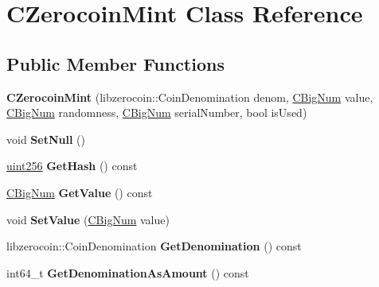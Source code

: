 \hypertarget{class_c_zerocoin_mint}{}\section{C\+Zerocoin\+Mint Class Reference}
\label{class_c_zerocoin_mint}
\subsection*{Public Member Functions}
\begin{DoxyCompactItemize}
\item 
\mbox{\label{class_c_zerocoin_mint_a6f178cd668b15c974a70d92f3e7d4118}} 
{\bfseries C\+Zerocoin\+Mint} (libzerocoin\+::\+Coin\+Denomination denom, \mbox{\hyperlink{class_c_big_num}{C\+Big\+Num}} value, \mbox{\hyperlink{class_c_big_num}{C\+Big\+Num}} randomness, \mbox{\hyperlink{class_c_big_num}{C\+Big\+Num}} serial\+Number, bool is\+Used)
\item 
\mbox{\label{class_c_zerocoin_mint_afd517487620060b8c218a6376c2983d7}} 
void {\bfseries Set\+Null} ()
\item 
\mbox{\label{class_c_zerocoin_mint_a4a6bdbc888a3f3aa9a78c54d19295251}} 
\mbox{\hyperlink{classuint256}{uint256}} {\bfseries Get\+Hash} () const
\item 
\mbox{\label{class_c_zerocoin_mint_ae5917a194b3ea08a5e9150231e965b82}} 
\mbox{\hyperlink{class_c_big_num}{C\+Big\+Num}} {\bfseries Get\+Value} () const
\item 
\mbox{\label{class_c_zerocoin_mint_af6da23621cc735be988627564f510e1c}} 
void {\bfseries Set\+Value} (\mbox{\hyperlink{class_c_big_num}{C\+Big\+Num}} value)
\item 
\mbox{\label{class_c_zerocoin_mint_a2461ba5a3488d7175240c111e551e571}} 
libzerocoin\+::\+Coin\+Denomination {\bfseries Get\+Denomination} () const
\item 
\mbox{\label{class_c_zerocoin_mint_a1abc6a0758889530b043e9faa74d64c2}} 
int64\+\_\+t {\bfseries Get\+Denomination\+As\+Amount} () const
\item 

\end{DoxyCompactItemize}

